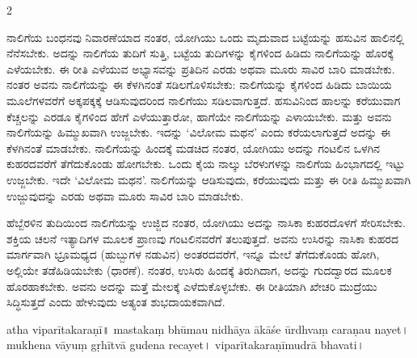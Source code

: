 \begin{multicols}{2}
\begin{kan}

ನಾಲಿಗೆಯ ಬಂಧನವು ನಿವಾರಣೆಯಾದ ನಂತರ, ಯೋಗಿಯು ಒಂದು ಮೃದುವಾದ ಬಟ್ಟೆಯನ್ನು ಹಸುವಿನ ಹಾಲಿನಲ್ಲಿ ನೆನೆಸಬೇಕು. ಅದನ್ನು ನಾಲಿಗೆಯ ತುದಿಗೆ ಸುತ್ತಿ, ಬಟ್ಟೆಯ ತುದಿಗಳನ್ನು ಕೈಗಳಿಂದ ಹಿಡಿದು ನಾಲಿಗೆಯನ್ನು ಹೊರಕ್ಕೆ ಎಳೆಯಬೇಕು. ಈ ರೀತಿ ಎಳೆಯುವ ಅಭ್ಯಾಸವನ್ನು ಪ್ರತಿದಿನ ಎರಡು ಅಥವಾ ಮೂರು ಸಾವಿರ ಬಾರಿ ಮಾಡಬೇಕು. ನಂತರ ಅವನು ನಾಲಿಗೆಯನ್ನು ಈ ಕೆಳಗಿನಂತೆ ಸಡಿಲಗೊಳಿಸಬೇಕು: ನಾಲಿಗೆಯನ್ನು ಕೈಗಳಿಂದ ಹಿಡಿದು ಬಾಯಿಯ ಮೂಲೆಗಳವರೆಗೆ ಅಕ್ಕಪಕ್ಕಕ್ಕೆ ಆಡಿಸುವುದರಿಂದ ನಾಲಿಗೆಯು ಸಡಿಲವಾಗುತ್ತದೆ. ಹಸುವಿನಿಂದ ಹಾಲನ್ನು ಕರೆಯುವಾಗ ಕೆಚ್ಚಲನ್ನು ಎರಡೂ ಕೈಗಳಿಂದ ಹೇಗೆ ಎಳೆಯುತ್ತಾರೋ, ಹಾಗೆಯೇ ನಾಲಿಗೆಯನ್ನು ಎಳಾಯಬೇಕು. ಮತ್ತು ಅವನು ನಾಲಿಗೆಯನ್ನು ಹಿಮ್ಮುಖವಾಗಿ ಉಜ್ಜಬೇಕು. ಇದನ್ನು ‘ವಿಲೋಮ ಮಥನ’ ಎಂದು ಕರೆಯಲಾಗುತ್ತದೆ ಅದನ್ನು ಈ ಕೆಳಗಿನಂತೆ ಮಾಡಬೇಕು. ನಾಲಿಗೆಯನ್ನು ಹಿಂದಕ್ಕೆ ಮಡಚಿದ ನಂತರ, ಯೋಗಿಯು ಅದನ್ನು ಗಂಟಲಿನ ಒಳಗಿನ ಕುಹರದವರೆಗೆ ತೆಗೆದುಕೊಂಡು ಹೋಗಬೇಕು. ಒಂದು ಕೈಯ ನಾಲ್ಕು ಬೆರಳುಗಳನ್ನು ನಾಲಿಗೆಯ ಹಿಂಭಾಗದಲ್ಲಿ ಇಟ್ಟು ಉಜ್ಜಬೇಕು. ಇದೇ ‘ವಿಲೋಮ ಮಥನ’. ನಾಲಿಗೆಯನ್ನು ಆಡಿಸುವುದು, ಕರೆಯುವುದು ಮತ್ತು ಈ ರೀತಿ ಹಿಮ್ಮುಖವಾಗಿ ಉಜ್ಜುವುದನ್ನು ಎರಡು ಅಥವಾ ಮೂರು ಸಾವಿರ ಬಾರಿ ಮಾಡಬೇಕು.
\vskip 7pt


ಹೆಬ್ಬೆರಳಿನ ತುದಿಯಿಂದ ನಾಲಿಗೆಯನ್ನು ಉಜ್ಜಿದ ನಂತರ, ಯೋಗಿಯು ಅದನ್ನು ನಾಸಿಕಾ ಕುಹರದೊಳಗೆ ಸೇರಿಸಬೇಕು. ಶಕ್ತಿಯ ಚಲನೆ ಇತ್ಯಾದಿಗಳ ಮೂಲಕ ಪ್ರಾಣವು ಗಂಟಲಿನವರೆಗೆ ತಲುಪುತ್ತದೆ. ಅವನು ಉಸಿರನ್ನು ನಾಸಿಕಾ ಕುಹರದ ಮಾರ್ಗವಾಗಿ ಭ್ರೂಮಧ್ಯದ (ಹುಬ್ಬುಗಳ ನಡುವಿನ) ಅಂತರದವರೆಗೆ, ಇನ್ನೂ ಮೇಲೆ ತೆಗೆದುಕೊಂಡು ಹೋಗಿ, ಅಲ್ಲಿಯೇ ತಡೆಹಿಡಿಯಬೇಕು (ಧಾರಣೆ). ನಂತರ, ಉಸಿರು ಹಿಂದಕ್ಕೆ ತಿರುಗಿದಾಗ, ಅದನ್ನು ಗುದದ್ವಾರದ ಮೂಲಕ ಹೊರಹಾಕಬೇಕು. ಅವನು ಅದನ್ನು ಮತ್ತೆ ಮೇಲಕ್ಕೆ ಎಳೆದುಕೊಳ್ಳಬೇಕು. ಈ ರೀತಿಯಾಗಿ ಖೇಚರಿ ಮುದ್ರೆಯು ಸಿದ್ಧಿಸುತ್ತದೆ ಎಂದು ಹೇಳುವುದು ಅತ್ಯಂತ ಶುಭದಾಯಕವಾಗಿದೆ.
\end{kan}
\end{multicols}

\newpage


\vskip 7pt

\begin{sans}
atha viparītakaraṇī\!॥%
mastakaṃ bhūmau nidhāya ākāśe ūrdhvaṃ\endnote{ūrdhvaṃ~] P, ūrdhva M.} caraṇau nayet\!। mukhena vāyuṃ gṛhītvā gudena recayet\!। viparītakaraṇīmudrā bhavati\!। 
\end{sans}
\bigskip

